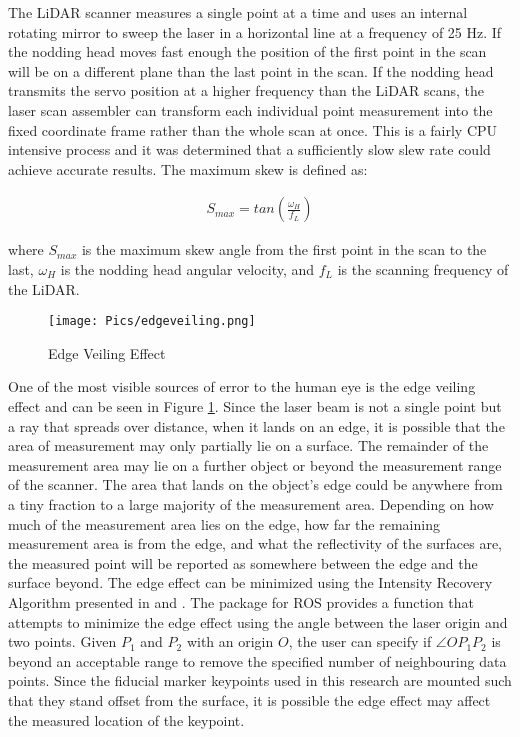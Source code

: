 The LiDAR scanner measures a single point at a time and uses an internal rotating mirror to sweep the laser in a horizontal line at a frequency of 25 Hz. If the nodding head moves fast enough the position of the first point in the scan will be on a different plane than the last point in the scan. If the nodding head transmits the servo position at a higher frequency than the LiDAR scans, the laser scan assembler can transform each individual point measurement into the fixed coordinate frame rather than the whole scan at once. This is a fairly CPU intensive process and it was determined that a sufficiently slow slew rate could achieve accurate results. The maximum skew is defined as:

\begin{align}
    S_{max} = tan\left(\frac{\omega_H}{f_L}\right)
\end{align}

where $S_{max}$ is the maximum skew angle from the first point in the scan to the last, $\omega_H$ is the nodding head angular velocity, and $f_L$ is the scanning frequency of the LiDAR.\\

\begin{figure}
    \centering
    \texttt{[image: Pics/edgeveiling.png]}
    \caption{Edge Veiling Effect}
    \label{fig:veiling}
\end{figure}

One of the most visible sources of error to the human eye is the edge veiling effect and can be seen in Figure \ref{fig:veiling}. Since the laser beam is not a single point but a ray that spreads over distance, when it lands on an edge, it is possible that the area of measurement may only partially lie on a surface. The remainder of the measurement area may lie on a further object or beyond the measurement range of the scanner. The area that lands on the object's edge could be anywhere from a tiny fraction to a large majority of the measurement area. Depending on how much of the measurement area lies on the edge, how far the remaining measurement area is from the edge, and what the reflectivity of the surfaces are, the measured point will be reported as somewhere between the edge and the surface beyond. The edge effect can be minimized using the Intensity Recovery Algorithm presented in \cite{bookbaredge} and \cite{theotherone}. The  package for ROS provides a  function that attempts to minimize the edge effect using the angle between the laser origin and two points. Given $P_1$ and $P_2$ with an origin $O$, the user can specify if $\angle OP_1P_2$ is beyond an acceptable range to remove the specified number of neighbouring data points. Since the fiducial marker keypoints used in this research are mounted such that they stand offset from the surface, it is possible the edge effect may affect the measured location of the keypoint.\\

